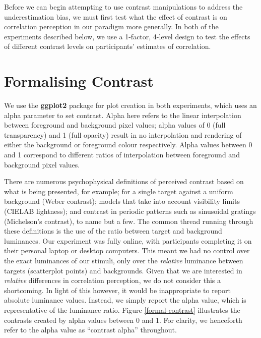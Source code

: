 \documentclass[preprint, 3p,
authoryear]{elsarticle} %
\begin{document}
Before we can begin attempting to use contrast manipulations to address
the underestimation bias, we must first test what the effect of contrast
is on correlation perception in our paradigm more generally. In both of
the experiments described below, we use a 1-factor, 4-level design to
test the effects of different contrast levels on participants' estimates
of correlation.

\hypertarget{formalising-contrast}{%
\section{Formalising Contrast}\label{formalising-contrast}}

We use the \textbf{ggplot2} \citep{hadley_gg2016} package for plot
creation in both experiments, which uses an alpha parameter to set
contrast. Alpha here refers to the linear interpolation
\citep{stone_2008} between foreground and background pixel values; alpha
values of 0 (full transparency) and 1 (full opacity) result in no
interpolation and rendering of either the background or foreground
colour respectively. Alpha values between 0 and 1 correspond to
different ratios of interpolation between foreground and background
pixel values.

There are numerous psychophysical definitions of perceived contrast
\citep{zuffi_2007} based on what is being presented, for example; for a
single target against a uniform background (Weber contrast); models that
take into account visibility limits (CIELAB lightness); and contrast in
periodic patterns such as sinusoidal gratings (Michelson's contrast), to
name but a few. The common thread running through these definitions is
the use of the ratio between target and background luminances. Our
experiment was fully online, with participants completing it on their
personal laptop or desktop computers. This meant we had no control over
the exact luminances of our stimuli, only over the \emph{relative}
luminance between targets (scatterplot points) and backgrounds. Given
that we are interested in \emph{relative} differences in correlation
perception, we do not consider this a shortcoming. In light of this
however, it would be inappropriate to report absolute luminance values.
Instead, we simply report the alpha value, which is representative of
the luminance ratio. Figure \ref{formal-contrast} illustrates the
contrasts created by alpha values between 0 and 1. For clarity, we
henceforth refer to the alpha value as ``contrast alpha'' throughout.
\end{document}
